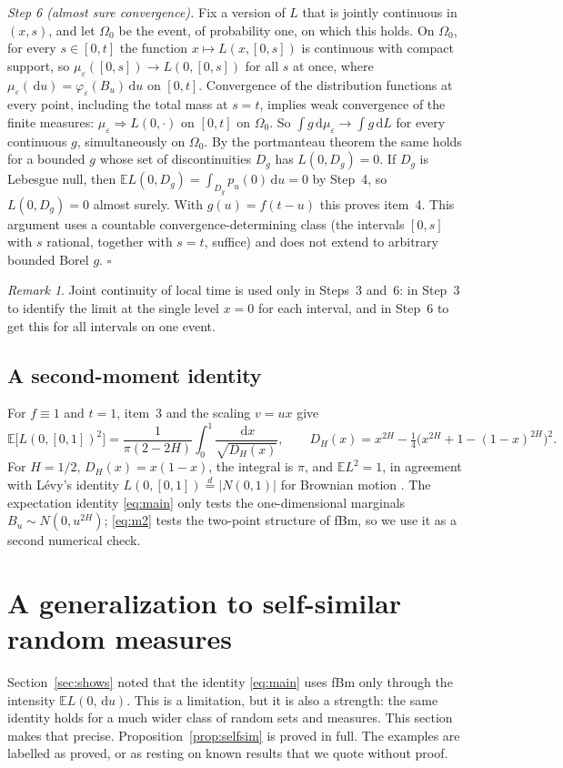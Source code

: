\documentclass[11pt]{article}
\theoremstyle{remark}
\newtheorem{remark}[theorem]{Remark}
\theoremstyle{definition}
\newcommand{\E}{\mathbb{E}}
\newcommand{\dd}{\,\mathrm{d}}
\begin{document}
\emph{Step 6 (almost sure convergence).} Fix a version of $L$ that is jointly continuous in $(x,s)$, and let $\Omega_0$ be the event, of probability one, on which this holds. On $\Omega_0$, for every $s\in[0,t]$ the function $x\mapsto L(x,[0,s])$ is continuous with compact support, so $\mu_\varepsilon([0,s])\to L(0,[0,s])$ for all $s$ at once, where $\mu_\varepsilon(\dd u)=\varphi_\varepsilon(B_u)\dd u$ on $[0,t]$. Convergence of the distribution functions at every point, including the total mass at $s=t$, implies weak convergence of the finite measures: $\mu_\varepsilon\Rightarrow L(0,\cdot)$ on $[0,t]$ on $\Omega_0$. So $\int g\dd\mu_\varepsilon\to\int g\dd L$ for every continuous $g$, simultaneously on $\Omega_0$. By the portmanteau theorem the same holds for a bounded $g$ whose set of discontinuities $D_g$ has $L(0,D_g)=0$. If $D_g$ is Lebesgue null, then $\E L(0,D_g)=\int_{D_g}p_u(0)\dd u=0$ by Step~4, so $L(0,D_g)=0$ almost surely. With $g(u)=f(t-u)$ this proves item~4. This argument uses a countable convergence-determining class (the intervals $[0,s]$ with $s$ rational, together with $s=t$, suffice) and does not extend to arbitrary bounded Borel $g$. \hfill$\square$

\begin{remark}
Joint continuity of local time is used only in Steps~3 and~6: in Step~3 to identify the limit at the single level $x=0$ for each interval, and in Step~6 to get this for all intervals on one event.
\end{remark}

\subsection{A second-moment identity}\label{sec:m2}
For $f\equiv1$ and $t=1$, item~3 and the scaling $v=ux$ give
\begin{equation}\label{eq:m2}
\E\big[L(0,[0,1])^2\big]=\frac{1}{\pi(2-2H)}\int_0^1\frac{\dd x}{\sqrt{D_H(x)}},\qquad D_H(x)=x^{2H}-\tfrac14\big(x^{2H}+1-(1-x)^{2H}\big)^2 .
\end{equation}
For $H=1/2$, $D_H(x)=x(1-x)$, the integral is $\pi$, and $\E L^2=1$, in agreement with L\'evy's identity $L(0,[0,1])\overset{d}{=}|N(0,1)|$ for Brownian motion \cite{RY99}. The expectation identity \eqref{eq:main} only tests the one-dimensional marginals $B_u\sim N(0,u^{2H})$; \eqref{eq:m2} tests the two-point structure of fBm, so we use it as a second numerical check.

\section{A generalization to self-similar random measures}\label{sec:selfsim}
Section~\ref{sec:shows} noted that the identity \eqref{eq:main} uses fBm only through the intensity $\E L(0,\dd u)$. This is a limitation, but it is also a strength: the same identity holds for a much wider class of random sets and measures. This section makes that precise. Proposition~\ref{prop:selfsim} is proved in full. The examples are labelled as proved, or as resting on known results that we quote without proof.
\end{document}
